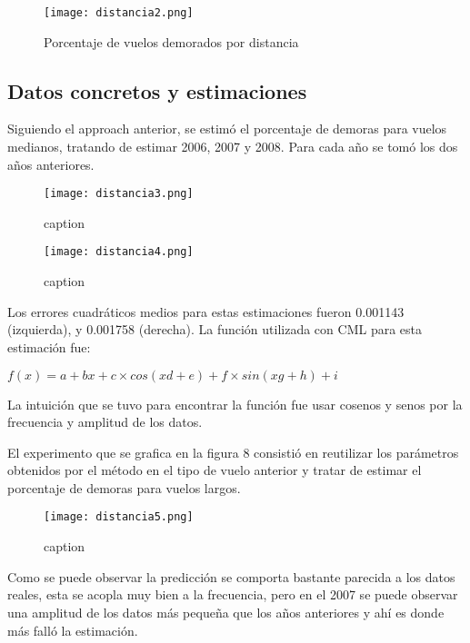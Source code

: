\begin{figure}[!htb]
\begin{center}
\texttt{[image: distancia2.png]}
\caption{Porcentaje de vuelos demorados por distancia}
\label{distancia-2}
\end{center}
\end{figure}



\subsection{Datos concretos y estimaciones}

Siguiendo el approach anterior, se estimó el porcentaje de demoras para vuelos medianos, tratando de estimar 2006, 2007 y 2008. Para cada año se tomó los dos años anteriores.

\begin{figure}[!htb]
\begin{center}
\texttt{[image: distancia3.png]}
\caption{caption}
\label{distancia-3}
\end{center}
\end{figure}

\begin{figure}[!hbt]
\begin{center}
\texttt{[image: distancia4.png]}
\caption{caption}
\label{distancia-4}
\end{center}
\end{figure}

Los errores cuadráticos medios para estas estimaciones fueron 0.001143 (izquierda), y 0.001758 (derecha). La función utilizada con CML para esta estimación fue:

$f(x) = a + bx + c \times cos(xd + e) + f \times sin(xg + h) + i$

La intuición que se tuvo para encontrar la función fue usar cosenos y senos por la frecuencia y amplitud de los datos.

El experimento que se grafica en la figura 8 consistió en reutilizar los parámetros obtenidos por el método en el tipo de vuelo anterior y tratar de estimar el porcentaje de demoras para vuelos largos.

\begin{figure}[!htb]
\begin{center}
\texttt{[image: distancia5.png]}
\caption{caption}
\label{distancia-5}
\end{center}
\end{figure}

Como se puede observar la predicción se comporta bastante parecida a los datos reales, esta se acopla muy bien a la frecuencia, pero en el 2007 se puede observar una amplitud de los datos más pequeña que los años anteriores y ahí es donde más falló la estimación.